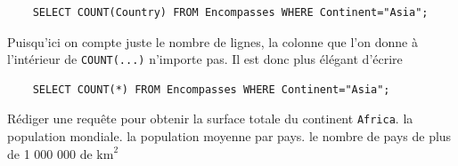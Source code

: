 \begin{verbatim}
    SELECT COUNT(Country) FROM Encompasses WHERE Continent="Asia";
\end{verbatim}

Puisqu'ici on compte juste le nombre de lignes, la colonne que l'on donne à l'intérieur de \texttt{COUNT(...)} n'importe pas. Il est donc plus élégant d'écrire

\begin{verbatim}
    SELECT COUNT(*) FROM Encompasses WHERE Continent="Asia";
\end{verbatim}

\ques Rédiger une requête pour obtenir
\ssques la surface totale du continent \texttt{Africa}.
\ssques la population mondiale.
\ssques la population moyenne par pays.
\ssques le nombre de pays de plus de 1 000 000 de $ \textrm{km}^2 $

%
%
%
%
%

